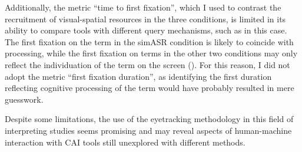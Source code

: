 Additionally, the metric ``time to first fixation'', which I used to contrast the recruitment of visual-spatial resources in the three conditions, is limited in its ability to compare tools with different query mechanisms, such as in this case. The first fixation on the term in the simASR condition is likely to coincide with processing, while the first fixation on terms in the other two conditions may only reflect the individuation of the term on the screen (). For this reason, I did not adopt the metric ``first fixation duration'', as identifying the first duration reflecting cognitive processing of the term would have probably resulted in mere guesswork.

Despite some limitations, the use of the eyetracking methodology in this field of interpreting studies seems promising and may reveal aspects of hu\-man-ma\-chine interaction with CAI tools still unexplored with different methods.
